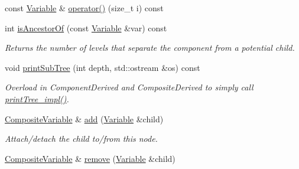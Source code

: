 \begin{DoxyCompactItemize}
\item 
const \hyperlink{classocra_1_1Variable}{Variable} \& \hyperlink{classocra_1_1CompositeVariable_a3896f318e7e23e058e42c4af80f84025}{operator()} (size\+\_\+t i) const 
\item 
int \hyperlink{classocra_1_1CompositeVariable_af5b185122366b8776b08051ca14f09bb}{is\+Ancestor\+Of} (const \hyperlink{classocra_1_1Variable}{Variable} \&var) const 
\begin{DoxyCompactList}\small\item\em Returns the number of levels that separate the component from a potential child. \end{DoxyCompactList}\item 
void \hyperlink{classocra_1_1CompositeVariable_a0ccd10c645d507353fcb76717c5f911b}{print\+Sub\+Tree} (int depth, std\+::ostream \&os) const 
\begin{DoxyCompactList}\small\item\em Overload in Component\+Derived and Composite\+Derived to simply call \hyperlink{classocra_1_1Composite_ab0c71f82bcd4779fa6812dc24b11ddec}{print\+Tree\+\_\+impl()}. \end{DoxyCompactList}\end{DoxyCompactItemize}
{\bf }\par
\begin{DoxyCompactItemize}
\item 
\hyperlink{classocra_1_1CompositeVariable}{Composite\+Variable} \& \hyperlink{classocra_1_1CompositeVariable_a3915b8d93a37f7431ce682bdbf725758}{add} (\hyperlink{classocra_1_1Variable}{Variable} \&child)
\begin{DoxyCompactList}\small\item\em Attach/detach the child to/from this node. \end{DoxyCompactList}\item 
\hyperlink{classocra_1_1CompositeVariable}{Composite\+Variable} \& \hyperlink{classocra_1_1CompositeVariable_ada9e93c4f85c641e2ec8f1152c0b851a}{remove} (\hyperlink{classocra_1_1Variable}{Variable} \&child)
\end{DoxyCompactItemize}

